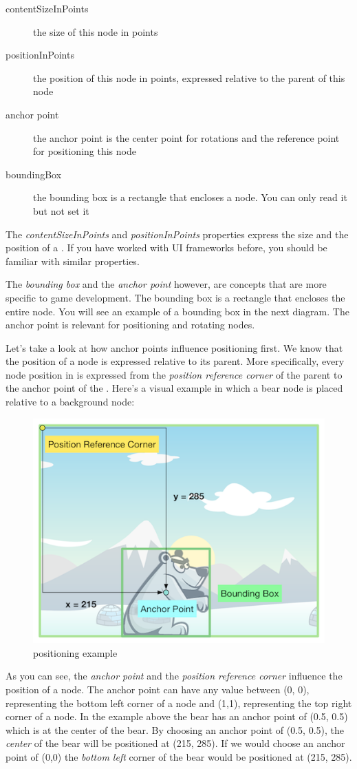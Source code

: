 \begin{description}
\item[contentSizeInPoints] the size of this node in points
\item[positionInPoints] the position of this node in points, expressed relative
to the parent of this node
\item[anchor point] the anchor point is the center point for rotations and the reference point for positioning this node
\item[boundingBox] the bounding box is a rectangle that encloses a node. You can
only read it but not set it
\end{description}

The \textit{contentSizeInPoints} and \textit{positionInPoints} properties
express the size and the position of a \ccnode{}. If you have worked with UI
frameworks before, you should be familiar with similar properties.

The \textit{bounding box} and the \textit{anchor point} however, are
concepts that are more specific to game development.
The bounding box is a rectangle that encloses the entire node. You will see an
example of a bounding box in the next diagram. The anchor point is relevant for positioning
and rotating nodes.

Let's take a look at how anchor points influence positioning first. We know
that the position of a node is expressed relative to its parent. More
specifically, every node position in \cocos{} is expressed from the \textit{position reference corner} of the parent
to the anchor point of the \ccnode{}. Here's a visual example in which a bear
node is placed relative to a background node:

\begin{figure}[H]
		\centering
		\includegraphics[width=0.5\linewidth]{images/cocos2d/ccnode/NodePositioning.png}     
		\caption{\ccnode{} positioning example}
\end{figure}

As you can see, the \textit{anchor point} and the \textit{position reference
corner} influence the position of a node. The anchor point can have any value
between (0, 0), representing the bottom left corner of a node and (1,1),
representing the top right corner of a node. In the example above the bear has
an anchor point of (0.5, 0.5) which is at the center of the bear. By choosing an
anchor point of (0.5, 0.5), the \textit{center} of the bear will be positioned
at (215, 285). If we would choose an anchor point of (0,0) the \textit{bottom
left} corner of the bear would be positioned at (215, 285).

